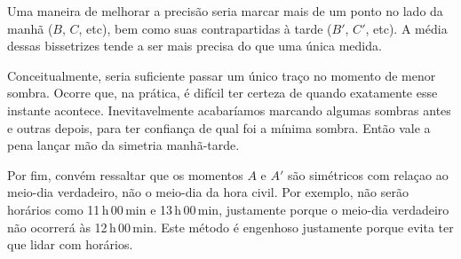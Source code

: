 Uma maneira de melhorar a precisão seria marcar mais de um ponto no lado da manhã ($B$, $C$, etc), bem como suas contrapartidas à tarde ($B'$, $C'$, etc). A média dessas bissetrizes tende a ser mais precisa do que uma única medida.

Conceitualmente, seria suficiente passar um único traço no momento de menor sombra. Ocorre que, na prática, é difícil ter certeza de quando exatamente esse instante acontece. Inevitavelmente acabaríamos marcando algumas sombras antes e outras depois, para ter confiança de qual foi a mínima sombra. Então vale a pena lançar mão da simetria manhã-tarde.

Por fim, convém ressaltar que os momentos $A$ e $A'$ são simétricos com relaçao ao meio-dia verdadeiro, não o meio-dia da hora civil. Por exemplo, não serão horários como 11\,h\,00\,min e 13\,h\,00\,min, justamente porque o meio-dia verdadeiro não ocorrerá às 12\,h\,00\,min. Este método é engenhoso justamente porque evita ter que lidar com horários.

